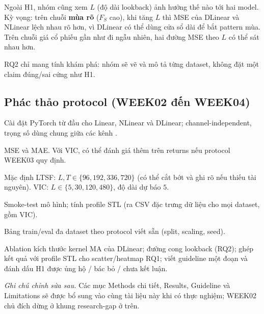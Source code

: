 Ngoài H1, nhóm cũng xem \(L\) (độ dài lookback) ảnh hưởng thế nào tới hai model.
Kỳ vọng: trên chuỗi \textbf{mùa rõ} (\(F_S\) cao), khi tăng \(L\) thì MSE của DLinear và NLinear
lệch nhau rõ hơn, vì DLinear có thể dùng cửa sổ dài để bắt pattern mùa.
Trên chuỗi giá cổ phiếu gần như đi ngẫu nhiên, hai đường MSE theo \(L\) có thể sát nhau hơn.

RQ2 chỉ mang tính khám phá: nhóm sẽ vẽ và mô tả từng dataset, không đặt một claim đúng/sai
cứng như H1.


\subsection{Phác thảo protocol (WEEK02 đến WEEK04)}

\begin{description}[style=nextline,leftmargin=2.2em]
      \item[Mô hình.]
            Cài đặt PyTorch từ đầu cho Linear, NLinear và DLinear;
            channel-independent, trọng số dùng chung giữa các kênh
            \cite{zeng2023ltsf}.
      \item[Metric.]
            MSE và MAE. Với VIC, có thể đánh giá thêm trên returns nếu protocol WEEK03 quy định.
      \item[Lookback / horizon.]
            Mặc định LTSF: \(L,T \in \{96,192,336,720\}\) (có thể cắt bớt và ghi rõ nếu thiếu tài nguyên).
            VIC: \(L \in \{5,30,120,480\}\), độ dài dự báo \(5\).
      \item[WEEK02.]
            Smoke-test mô hình; tính profile STL (ra CSV đặc trưng dữ liệu cho mọi dataset, gồm VIC).
      \item[WEEK03.]
            Bảng train/eval đa dataset theo protocol viết sẵn (split, scaling, seed).
      \item[WEEK04.]
            Ablation kích thước kernel MA của DLinear; đường cong lookback (RQ2);
            ghép kết quả với profile STL cho scatter/heatmap RQ1;
            viết guideline một đoạn và đánh dấu H1 được ủng hộ / bác bỏ / chưa kết luận.
\end{description}

\noindent\textit{Ghi chú chỉnh sửa sau.}
Các mục Methods chi tiết, Results, Guideline và Limitations sẽ được bổ sung vào cùng tài liệu
này khi có thực nghiệm; WEEK02 chủ đích dừng ở khung research-gap ở trên.
